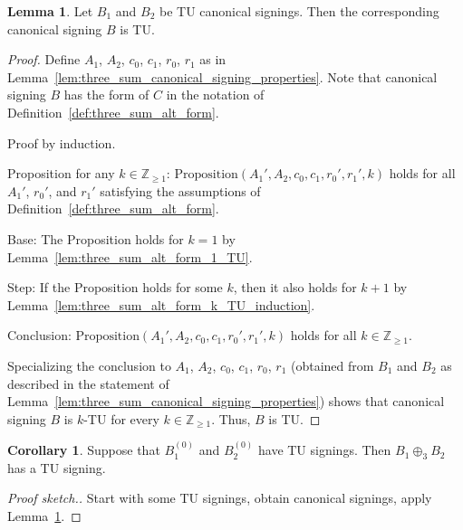 \documentclass{article}
\theoremstyle{definition}
\newtheorem{lemma}[theorem]{Lemma}
\newtheorem{corollary}[theorem]{Corollary}
\begin{document}
\begin{lemma}\label{lem:three_sum_canonical_signing_TU}
    Let $B_{1}$ and $B_{2}$ be TU canonical signings. Then the corresponding canonical signing $B$ is TU.
\end{lemma}

\begin{proof}
    Define $A_{1}$, $A_{2}$, $c_{0}$, $c_{1}$, $r_{0}$, $r_{1}$ as in Lemma~\ref{lem:three_sum_canonical_signing_properties}. Note that canonical signing $B$ has the form of $C$ in the notation of Definition~\ref{def:three_sum_alt_form}.

    Proof by induction.

    Proposition for any $k \in \mathbb{Z}_{\geq 1}$: $\mathrm{Proposition}(A_{1}', A_{2}, c_{0}, c_{1}, r_{0}', r_{1}', k)$ holds for all $A_{1}'$, $r_{0}'$, and $r_{1}'$ satisfying the assumptions of Definition~\ref{def:three_sum_alt_form}.

    Base: The Proposition holds for $k = 1$ by Lemma~\ref{lem:three_sum_alt_form_1_TU}.

    Step: If the Proposition holds for some $k$, then it also holds for $k + 1$ by Lemma~\ref{lem:three_sum_alt_form_k_TU_induction}.

    Conclusion: $\mathrm{Proposition}(A_{1}', A_{2}, c_{0}, c_{1}, r_{0}', r_{1}', k)$ holds for all $k \in \mathbb{Z}_{\geq 1}$.

    Specializing the conclusion to $A_{1}$, $A_{2}$, $c_{0}$, $c_{1}$, $r_{0}$, $r_{1}$ (obtained from $B_{1}$ and $B_{2}$ as described in the statement of Lemma~\ref{lem:three_sum_canonical_signing_properties}) shows that canonical signing $B$ is $k$-TU for every $k \in \mathbb{Z}_{\geq 1}$. Thus, $B$ is TU.
\end{proof}

\begin{corollary}
    Suppose that $B_{1}^{(0)}$ and $B_{2}^{(0)}$ have TU signings. Then $B_{1} \oplus_{3} B_{2}$ has a TU signing.
\end{corollary}

\begin{proof}[Proof sketch.]
    Start with some TU signings, obtain canonical signings, apply Lemma~\ref{lem:three_sum_canonical_signing_TU}.
\end{proof}
\end{document}
